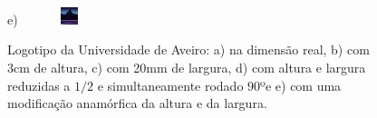 \documentclass{report}
\begin{document}
\begin{figure}[h]
                    e)\includegraphics[height=5mm,width=3cm]{test}
                \caption{Logotipo da Universidade de Aveiro:
                a) na dimensão real,
                    b) com 3cm de altura,
                    c) com 20mm de largura,
                    d) com altura e largura reduzidas a $1/2$ e simultaneamente rodado 90ºe
                    e) com uma modificação anamórfica da altura e da largura.}
                \label{fig:ualogo.2}
            \end{figure}
    
    
    
    
    
    
\end{document}
